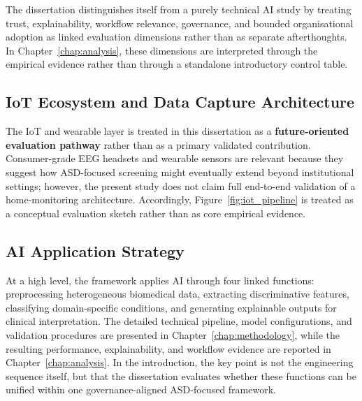 

\noindent The dissertation distinguishes itself from a purely technical AI study by treating trust, explainability, workflow relevance, governance, and bounded organisational adoption as linked evaluation dimensions rather than as separate afterthoughts. In Chapter~\ref{chap:analysis}, these dimensions are interpreted through the empirical evidence rather than through a standalone introductory control table.

\label{tab:six_differentiators}

\subsection{IoT Ecosystem and Data Capture Architecture}
\label{sec:iot_ecosystem}

\noindent The IoT and wearable layer is treated in this dissertation as a \textbf{future-oriented evaluation pathway} rather than as a primary validated contribution. Consumer-grade EEG headsets and wearable sensors are relevant because they suggest how ASD-focused screening might eventually extend beyond institutional settings; however, the present study does not claim full end-to-end validation of a home-monitoring architecture. Accordingly, Figure~\ref{fig:iot_pipeline} is treated as a conceptual evaluation sketch rather than as core empirical evidence.

\label{fig:iot_pipeline}

\subsection{AI Application Strategy}
\label{sec:ai_application}

\noindent At a high level, the framework applies AI through four linked functions: preprocessing heterogeneous biomedical data, extracting discriminative features, classifying domain-specific conditions, and generating explainable outputs for clinical interpretation. The detailed technical pipeline, model configurations, and validation procedures are presented in Chapter~\ref{chap:methodology}, while the resulting performance, explainability, and workflow evidence are reported in Chapter~\ref{chap:analysis}. In the introduction, the key point is not the engineering sequence itself, but that the dissertation evaluates whether these functions can be unified within one governance-aligned ASD-focused framework.

